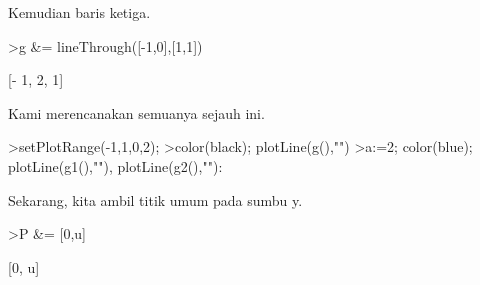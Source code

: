 \documentclass[12pt,arial,letterpaper]{book}
\begin{document}
\begin{eulernootebook}
\begin{eulercomment}
\begin{eulercomment}
\begin{eulernootebook}
\begin{eulercomment}
\begin{eulercomment}
\begin{eulercomment}
\begin{eulercomment}
\begin{eulercomment}
\begin{eulercomment}
\begin{eulernotebook}
\begin{eulercomment}
\begin{eulercomment}
\begin{eulercomment}
\begin{eulercomment}
\begin{eulercomment}
\begin{eulercomment}
\begin{euleroutput}
\end{euleroutput}
\begin{eulercomment}
Kemudian baris ketiga.
\end{eulercomment}
\begin{eulerprompt}
>g &= lineThrough([-1,0],[1,1])
\end{eulerprompt}
\begin{euleroutput}
  
                               [- 1, 2, 1]
  
\end{euleroutput}
\begin{eulercomment}
Kami merencanakan semuanya sejauh ini.
\end{eulercomment}
\begin{eulerprompt}
>setPlotRange(-1,1,0,2);
>color(black); plotLine(g(),"")
>a:=2; color(blue); plotLine(g1(),""), plotLine(g2(),""):
\end{eulerprompt}
\begin{eulercomment}
Sekarang, kita ambil titik umum pada sumbu y.
\end{eulercomment}
\begin{eulerprompt}
>P &= [0,u]
\end{eulerprompt}
\begin{euleroutput}
  
                                  [0, u]
  

\end{euleroutput}
\end{eulercomment}
\end{eulercomment}
\end{eulercomment}
\end{eulercomment}
\end{eulercomment}
\end{eulercomment}
\end{eulernotebook}
\end{eulercomment}
\end{eulercomment}
\end{eulercomment}
\end{eulercomment}
\end{eulercomment}
\end{eulercomment}
\end{eulernootebook}
\end{eulercomment}
\end{eulercomment}
\end{eulernootebook}
\end{document}
